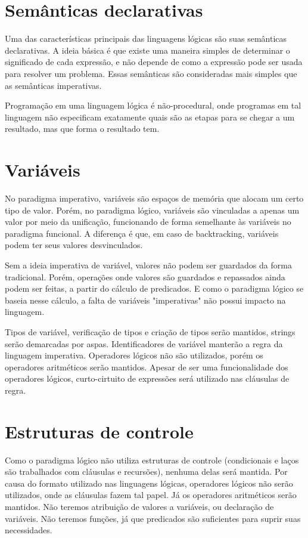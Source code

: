 \documentclass[12pt, a4paper]{article}
\begin{document}
\section{Semânticas declarativas}
Uma das características principais das linguagens lógicas são suas
semânticas declarativas. A ideia básica é que existe uma maneira
simples de determinar o significado de cada expressão, e não depende de
como a expressão pode ser usada para resolver um problema. Essas
semânticas são consideradas mais simples que as semânticas imperativas.

Programação em uma linguagem lógica é não-procedural, onde programas em
tal linguagem não especificam exatamente quais são as etapas para se
chegar a um resultado, mas que forma o resultado tem.

\section{Variáveis}
No paradigma imperativo, variáveis são espaços de memória que alocam um
certo tipo de valor. Porém, no paradigma lógico, variáveis são
vinculadas a apenas um valor por meio da unificação, funcionando de
forma semelhante às variáveis no paradigma funcional. A diferença é
que, em caso de backtracking, variáveis podem ter seus valores
desvinculados.

Sem a ideia imperativa de variável, valores não podem ser guardados da
forma tradicional. Porém, operações onde valores são guardados e
repassados ainda podem ser feitas, a partir do cálculo de predicados. E
como o paradigma lógico se baseia nesse cálculo, a falta de variáveis
"imperativas" não possui impacto na linguagem.

Tipos de variável, verificação de tipos e criação de tipos serão mantidos,
strings serão demarcadas por aspas.  Identificadores de variável manterão a
regra da linguagem imperativa.  Operadores lógicos não são utilizados, porém os
operadores aritméticos serão mantidos. Apesar de ser uma funcionalidade dos
operadores lógicos, curto-cirtuito de expressões será utilizado nas cláusulas
de regra.

\section{Estruturas de controle}
Como o paradigma lógico não utiliza estruturas de controle
(condicionais e laços são trabalhados com cláusulas e recursões),
nenhuma delas será mantida. Por causa do formato utilizado nas
linguagens lógicas, operadores lógicos não serão utilizados, onde as
cláusulas fazem tal papel. Já os operadores aritméticos serão mantidos.
Não teremos atribuição de valores a variáveis, ou declaração de
variáveis. Não teremos funções, já que predicados são suficientes para
suprir suas necessidades.
\end{document}
